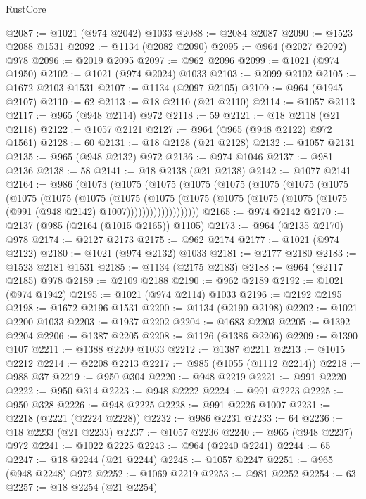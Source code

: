 \begin{lexlean}{RustCore}
\begin{coremodule}
@2087 := @1021 (@974 @2042) @1033
@2088 := @2084 @2087
@2090 := @1523 @2088 @1531
@2092 := @1134 (@2082 @2090)
@2095 := @964 (@2027 @2092) @978
@2096 := @2019 @2095
@2097 := @962 @2096
@2099 := @1021 (@974 @1950)
@2102 := @1021 (@974 @2024) @1033
@2103 := @2099 @2102
@2105 := @1672 @2103 @1531
@2107 := @1134 (@2097 @2105)
@2109 := @964 (@1945 @2107)
@2110 := 62
@2113 := @18 @2110 (@21 @2110)
@2114 := @1057 @2113
@2117 := @965 (@948 @2114) @972
@2118 := 59
@2121 := @18 @2118 (@21 @2118)
@2122 := @1057 @2121
@2127 := @964 (@965 (@948 @2122) @972 @1561)
@2128 := 60
@2131 := @18 @2128 (@21 @2128)
@2132 := @1057 @2131
@2135 := @965 (@948 @2132) @972
@2136 := @974 @1046
@2137 := @981 @2136
@2138 := 58
@2141 := @18 @2138 (@21 @2138)
@2142 := @1077 @2141
@2164 := @986
    (@1073
      (@1075
        (@1075
          (@1075
            (@1075
              (@1075
                (@1075
                  (@1075
                    (@1075
                      (@1075
                        (@1075
                          (@1075
                            (@1075
                              (@1075
                                (@1075
                                  (@1075 (@1075 (@1075 (@991 (@948 @2142) @1007)))))))))))))))))))
@2165 := @974 @2142
@2170 := @2137 (@985 (@2164 (@1015 @2165)) @1105)
@2173 := @964 (@2135 @2170) @978
@2174 := @2127 @2173
@2175 := @962 @2174
@2177 := @1021 (@974 @2122)
@2180 := @1021 (@974 @2132) @1033
@2181 := @2177 @2180
@2183 := @1523 @2181 @1531
@2185 := @1134 (@2175 @2183)
@2188 := @964 (@2117 @2185) @978
@2189 := @2109 @2188
@2190 := @962 @2189
@2192 := @1021 (@974 @1942)
@2195 := @1021 (@974 @2114) @1033
@2196 := @2192 @2195
@2198 := @1672 @2196 @1531
@2200 := @1134 (@2190 @2198)
@2202 := @1021 @2200 @1033
@2203 := @1937 @2202
@2204 := @1683 @2203
@2205 := @1392 @2204
@2206 := @1387 @2205
@2208 := @1126 (@1386 @2206)
@2209 := @1390 @107
@2211 := @1388 @2209 @1033
@2212 := @1387 @2211
@2213 := @1015 @2212
@2214 := @2208 @2213
@2217 := @985 (@1055 (@1112 @2214))
@2218 := @988 @37
@2219 := @950 @304
@2220 := @948 @2219
@2221 := @991 @2220
@2222 := @950 @314
@2223 := @948 @2222
@2224 := @991 @2223
@2225 := @950 @328
@2226 := @948 @2225
@2228 := @991 @2226 @1007
@2231 := @2218 (@2221 (@2224 @2228))
@2232 := @986 @2231
@2233 := 64
@2236 := @18 @2233 (@21 @2233)
@2237 := @1057 @2236
@2240 := @965 (@948 @2237) @972
@2241 := @1022 @2225
@2243 := @964 (@2240 @2241)
@2244 := 65
@2247 := @18 @2244 (@21 @2244)
@2248 := @1057 @2247
@2251 := @965 (@948 @2248) @972
@2252 := @1069 @2219
@2253 := @981 @2252
@2254 := 63
@2257 := @18 @2254 (@21 @2254)

\end{coremodule}
\end{lexlean}
